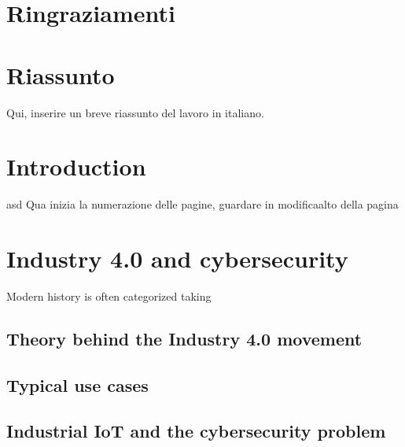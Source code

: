 \documentclass[a4paper, 12pt]{book}
\begin{document}
\pagestyle{empty}
\clearpage
\tableofcontents
\thispagestyle{empty}

\chapter{Ringraziamenti}


\chapter{Riassunto}

Qui, inserire un breve riassunto del lavoro in italiano.


\chapter{Introduction}
\pagestyle{fancy}
\fancyhf{}
\renewcommand{\headrulewidth}{2pt}
\fancyhead[EL]{\textbf{\textsf{\nouppercase\thepage}}}
\fancyhead[ER]{\textbf{\textsf{\nouppercase\leftmark}}}
\fancyhead[OR]{\textbf{\textsf{\nouppercase\thepage}}}
\fancyhead[OL]{\textbf{\textsf{\nouppercase {\rightmark}}}}

\thispagestyle{empty}

asd
\newpage
Qua inizia la numerazione delle pagine, guardare in modificaalto della pagina

\chapter{Industry 4.0 and cybersecurity}
Modern history is often categorized taking 
\section{Theory behind the Industry 4.0 movement}
\section{Typical use cases}
\section{Industrial IoT and the cybersecurity problem}
\end{document}
